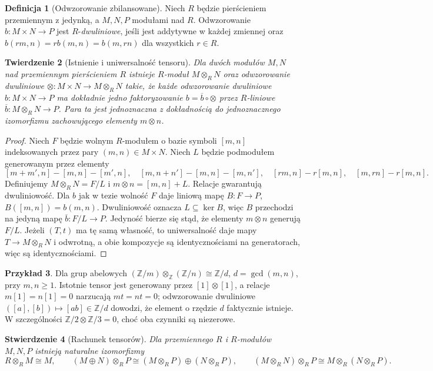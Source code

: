 \documentclass[11pt,a4paper,oneside]{report}
\newcommand{\Z}{\mathbb{Z}}
\theoremstyle{plain}
\newtheorem{twierdzenie}{Twierdzenie}[section]
\newtheorem{stwierdzenie}[twierdzenie]{Stwierdzenie}
\theoremstyle{definition}
\newtheorem{definicja}[twierdzenie]{Definicja}
\newtheorem{przyklad}[twierdzenie]{Przykład}
\theoremstyle{remark}
\begin{document}
\begin{definicja}[Odwzorowanie zbilansowane]
Niech $R$ będzie pierścieniem przemiennym z jedynką,
a $M,N,P$ modułami nad $R$. Odwzorowanie
$b:M\times N\to P$ jest $R$-\emph{dwuliniowe}, jeśli jest
addytywne w każdej zmiennej oraz
$b(rm,n)=r b(m,n)=b(m,rn)$ dla wszystkich $r\in R$.
\end{definicja}
\begin{twierdzenie}[Istnienie i uniwersalność tensoru]
\label{thm:tensor-uni-v5}
Dla dwóch modułów $M,N$ nad przemiennym pierścieniem $R$
istnieje $R$-moduł $M\otimes_RN$ oraz odwzorowanie
dwuliniowe $\otimes:M\times N\to M\otimes_RN$ takie, że
każde odwzorowanie dwuliniowe $b:M\times N\to P$
ma dokładnie jedno faktoryzowanie
$b=\overline b\circ\otimes$ przez $R$-liniowe
$\overline b:M\otimes_RN\to P$.
Para ta jest jednoznaczna z dokładnością do jednoznacznego
izomorfizmu zachowującego elementy $m\otimes n$.
\end{twierdzenie}
\begin{proof}
Niech $F$ będzie wolnym $R$-modułem o bazie symboli $[m,n]$
indeksowanych przez pary $(m,n)\in M\times N$.
Niech $L$ będzie podmodułem generowanym przez elementy
\[
[m+m',n]-[m,n]-[m',n],\quad
[m,n+n']-[m,n]-[m,n'],\quad
[rm,n]-r[m,n],\quad[m,rn]-r[m,n].
\]
Definiujemy $M\otimes_RN=F/L$ i $m\otimes n=[m,n]+L$.
Relacje gwarantują dwuliniowość. Dla $b$ jak w tezie
wolność $F$ daje liniową mapę $B:F\to P$, $B([m,n])=b(m,n)$.
Dwuliniowość oznacza $L\subseteq\ker B$, więc $B$ przechodzi
na jedyną mapę $\overline b:F/L\to P$. Jedyność bierze się
stąd, że elementy $m\otimes n$ generują $F/L$.
Jeżeli $(T,t)$ ma tę samą własność, to uniwersalność daje
mapy $T\to M\otimes_RN$ i odwrotną, a obie kompozycje
są identycznościami na generatorach, więc są identycznościami.
\end{proof}
\begin{przyklad}
Dla grup abelowych $(\Z/m)\otimes_\Z(\Z/n)\cong\Z/d$,
$d=\gcd(m,n)$, przy $m,n\ge1$. Istotnie tensor jest
generowany przez $[1]\otimes[1]$, a relacje $m[1]=n[1]=0$
narzucają $m t=nt=0$; odwzorowanie dwuliniowe
$([a],[b])\mapsto[ab]\in\Z/d$ dowodzi, że element
o rzędzie $d$ faktycznie istnieje. W szczególności
$\Z/2\otimes\Z/3=0$, choć oba czynniki są niezerowe.
\end{przyklad}
\begin{stwierdzenie}[Rachunek tensorów]
Dla przemiennego $R$ i $R$-modułów $M,N,P$ istnieją naturalne
izomorfizmy
\[
R\otimes_RM\cong M,\qquad
(M\oplus N)\otimes_RP\cong(M\otimes_RP)\oplus(N\otimes_RP),
\qquad (M\otimes_RN)\otimes_RP\cong M\otimes_R(N\otimes_RP).
\]
\end{stwierdzenie}
\end{document}
